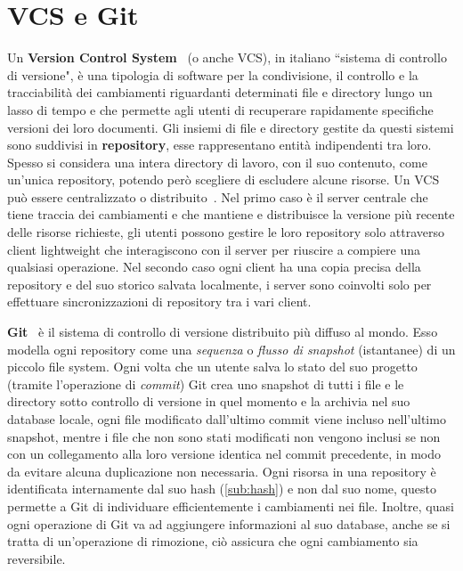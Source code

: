 \section{VCS e Git}
\label{sub:vcs}
Un \textbf{Version Control System}~\cite{vcs1} (o anche VCS), in italiano ``sistema di controllo di versione",
è una tipologia di software per la condivisione,
il controllo e la tracciabilità dei cambiamenti riguardanti determinati file e directory
lungo un lasso di tempo e che permette agli utenti di recuperare rapidamente specifiche
versioni dei loro documenti. Gli insiemi di file e directory gestite da questi sistemi
sono suddivisi in \textbf{repository}, esse rappresentano entità indipendenti tra loro.
Spesso si considera una intera directory di lavoro, con il suo contenuto,
come un'unica repository, potendo però scegliere di escludere alcune risorse.
Un VCS può essere centralizzato o distribuito~\cite{vcs2}.
Nel primo caso è il server centrale che tiene traccia dei cambiamenti e che mantiene e
distribuisce la versione più recente delle risorse richieste, gli utenti possono gestire
le loro repository solo attraverso client lightweight che interagiscono con il server
per riuscire a compiere una qualsiasi operazione.
Nel secondo caso ogni client ha una copia precisa della repository e del suo storico
salvata localmente, i server sono coinvolti solo per effettuare sincronizzazioni
di repository tra i vari client. 

\label{sub:git}
\textbf{Git}~\cite{git-21} è il sistema di controllo di versione distribuito più diffuso al mondo.
Esso modella ogni repository come una \emph{sequenza} o \emph{flusso di snapshot} (istantanee)
di un piccolo file system. Ogni volta che un utente salva lo stato del suo progetto
(tramite l'operazione di \emph{commit}) Git crea uno snapshot di tutti i file e le directory
sotto controllo di versione in quel momento e la archivia nel suo database locale, ogni
file modificato dall'ultimo commit viene incluso nell'ultimo snapshot, mentre i file che
non sono stati modificati non vengono inclusi se non con un collegamento alla loro versione identica
nel commit precedente, in modo da evitare alcuna duplicazione non necessaria.
Ogni risorsa in una repository è identificata internamente dal suo hash (\autoref{sub:hash}) e non dal suo nome,
questo permette a Git di individuare efficientemente i cambiamenti nei file.
Inoltre, quasi ogni operazione di Git va ad aggiungere informazioni al suo database, anche se si tratta
di un'operazione di rimozione, ciò assicura che ogni cambiamento sia reversibile.


